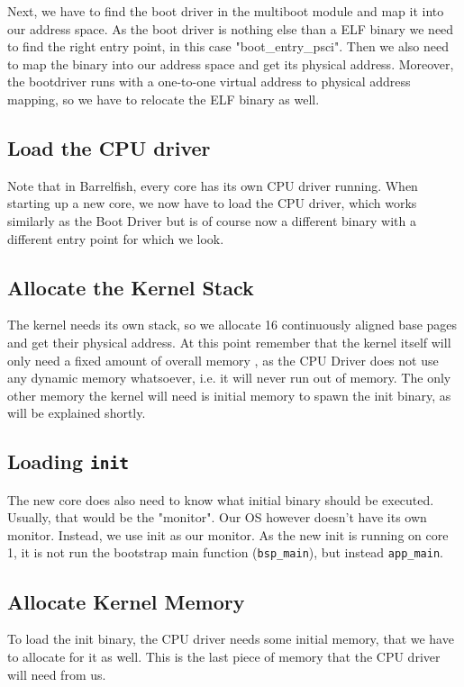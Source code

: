 Next, we have to find the boot driver in the multiboot module and map it into
our address space. As the boot driver is nothing else than a ELF binary we need
to find the right entry point, in this case "boot\_entry\_psci". Then we also
need to map the binary into our address space and get its physical address.
Moreover, the bootdriver runs with a one-to-one virtual address to physical
address mapping, so we have to relocate the ELF binary as well.

\subsection{Load the CPU driver}

Note that in Barrelfish, every core has its own CPU driver running.
When starting up a new core, we now have to load the CPU driver, which 
works similarly as the Boot Driver but is of course now a different binary
with a different entry point for which we look.

\subsection{Allocate the Kernel Stack}

The kernel needs its own stack, so we allocate 16 continuously aligned base
pages and get their physical address.
At this point remember that the kernel itself will only need a fixed amount of overall memory
, as the CPU Driver does not use any dynamic memory whatsoever, i.e. it will never run out of memory.
The only other memory the kernel will need is initial memory to spawn the init binary, as will be
explained shortly.

\subsection{Loading \texttt{init}}
The new core does also need to know what initial binary should be executed.
Usually, that would be the "monitor". Our OS however doesn't have its own monitor.
Instead, we use init as our monitor. As the new init is running on core 1, it is
not run the bootstrap main function (\texttt{bsp\_main}), but instead \texttt{app\_main}.

\subsection{Allocate Kernel Memory}

To load the init binary, the CPU driver needs some initial memory, that we have
to allocate for it as well. This is the last piece of memory that the CPU driver will need from us.

